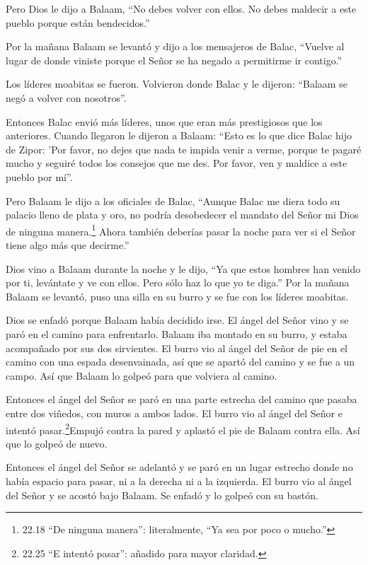  Pero Dios le dijo a Balaam, ``No debes volver con ellos.
No debes maldecir a este pueblo porque están bendecidos.''

 Por la mañana Balaam se levantó y dijo a los mensajeros de
Balac, ``Vuelve al lugar de donde viniste porque el Señor se ha negado a
permitirme ir contigo.''

 Los líderes moabitas se fueron. Volvieron donde Balac y le
dijeron: ``Balaam se negó a volver con nosotros''.

 Entonces Balac envió más líderes, unos que eran más
prestigiosos que los anteriores.  Cuando llegaron le
dijeron a Balaam: ``Esto es lo que dice Balac hijo de Zipor: 'Por favor,
no dejes que nada te impida venir a verme,  porque te
pagaré mucho y seguiré todos los consejos que me des. Por favor, ven y
maldice a este pueblo por mí''.

 Pero Balaam le dijo a los oficiales de Balac, ``Aunque
Balac me diera todo su palacio lleno de plata y oro, no podría
desobedecer el mandato del Señor mi Dios de ninguna manera.\footnote{22.18
  ``De ninguna manera'': literalmente, ``Ya sea por poco o mucho.''}
 Ahora también deberías pasar la noche para ver si el Señor
tiene algo más que decirme.''

 Dios vino a Balaam durante la noche y le dijo, ``Ya que
estos hombres han venido por ti, levántate y ve con ellos. Pero sólo haz
lo que yo te diga.''  Por la mañana Balaam se levantó, puso
una silla en su burro y se fue con los líderes moabitas.

 Dios se enfadó porque Balaam había decidido irse. El ángel
del Señor vino y se paró en el camino para enfrentarlo. Balaam iba
montado en su burro, y estaba acompañado por sus dos sirvientes.
 El burro vio al ángel del Señor de pie en el camino con
una espada desenvainada, así que se apartó del camino y se fue a un
campo. Así que Balaam lo golpeó para que volviera al camino.

 Entonces el ángel del Señor se paró en una parte estrecha
del camino que pasaba entre dos viñedos, con muros a ambos lados.
 El burro vio al ángel del Señor e intentó
pasar.\footnote{22.25 ``E intentó pasar'': añadido para mayor claridad.}Empujó
contra la pared y aplastó el pie de Balaam contra ella. Así que lo
golpeó de nuevo.

 Entonces el ángel del Señor se adelantó y se paró en un
lugar estrecho donde no había espacio para pasar, ni a la derecha ni a
la izquierda.  El burro vio al ángel del Señor y se acostó
bajo Balaam. Se enfadó y lo golpeó con su bastón.

